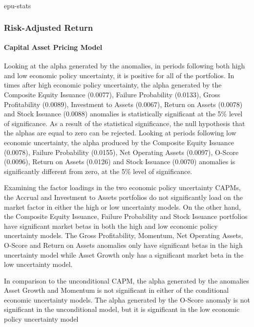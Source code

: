 \documentclass[12pt, a4paper, oneside]{article}
\begin{document}
{epu-stats}

\subsubsection{Risk-Adjusted Return}
\paragraph{Capital Asset Pricing Model}
Looking at the alpha generated by the anomalies, in periods following both high and low economic policy uncertainty, it is positive for all of the portfolios. In times after high economic policy uncertainty, the alpha generated by the Composite Equity Issuance (0.0077), Failure Probability (0.0133), Gross Profitability (0.0089), Investment to Assets (0.0067), Return on Assets (0.0078) and Stock Issuance (0.0088) anomalies is statistically significant at the 5\% level of significance. As a result of the statistical significance, the null hypothesis that the alphas are equal to zero can be rejected. Looking at periods following low economic uncertainty, the alpha produced by the Composite Equity Issuance (0.0078), Failure Probability (0.0155), Net Operating Assets (0.0097), O-Score (0.0096), Return on Assets (0.0126) and Stock Issuance (0.0070) anomalies is significantly different from zero, at the 5\% level of significance. 

Examining the factor loadings in the two economic policy uncertainty CAPMs, the Accrual and Investment to Assets portfolios do not significantly load on the market factor in either the high or low uncertainty models. On the other hand, the Composite Equity Issuance, Failure Probability and Stock Issuance portfolios have significant market betas in both the high and low economic policy uncertainty models. The Gross Profitability, Momentum, Net Operating Assets, O-Score and Return on Assets anomalies only have significant betas in the high uncertainty model while Asset Growth only has a significant market beta in the low uncertainty model.

In comparison to the unconditional CAPM, the alpha generated by the anomalies Asset Growth and Momentum is not significant in either of the conditional economic uncertainty models. The alpha generated by the O-Score anomaly is not significant in the unconditional model, but it is significant in the low economic policy uncertainty model
\end{document}
